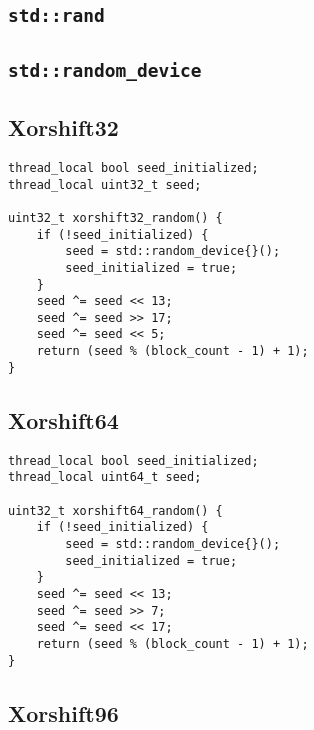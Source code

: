 	

\subsection[\lstinline{std::rand}]{\lstinline{std::rand}} \label{subsec:rand}

	

\subsection[\lstinline{std::random_device}]{\lstinline{std::random_device}} \label{subsec:random_device}

	

\subsection[Xorshift32]{Xorshift32} \label{subsec:xorshift32}

\begin{@empty}
	\lstset{
		language = [ISO]C++,
		style = basic
	}
	\begin{lstlisting}
thread_local bool seed_initialized;
thread_local uint32_t seed;

uint32_t xorshift32_random() {
	if (!seed_initialized) {
		seed = std::random_device{}();
		seed_initialized = true;
	}
	seed ^= seed << 13;
	seed ^= seed >> 17;
	seed ^= seed << 5;
	return (seed % (block_count - 1) + 1);
}
	\end{lstlisting}
\end{@empty}

\subsection[Xorshift64]{Xorshift64} \label{subsec:xorshift64}

\begin{@empty}
	\lstset{
		language = [ISO]C++,
		style = basic
	}
	\begin{lstlisting}
thread_local bool seed_initialized;
thread_local uint64_t seed;

uint32_t xorshift64_random() {
	if (!seed_initialized) {
		seed = std::random_device{}();
		seed_initialized = true;
	}
	seed ^= seed << 13;
	seed ^= seed >> 7;
	seed ^= seed << 17;
	return (seed % (block_count - 1) + 1);
}
	\end{lstlisting}
\end{@empty}

\subsection[Xorshift96]{Xorshift96} \label{subsec:xorshift96}

